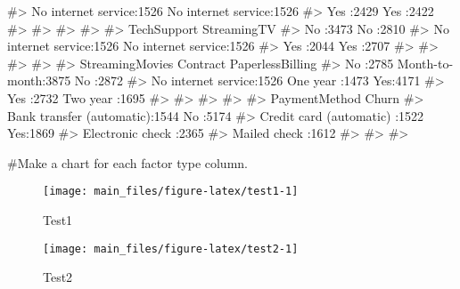 \begin{Schunk}
\begin{Soutput}
#>  No internet service:1526   No internet service:1526   
#>  Yes                :2429   Yes                :2422   
#>                                                        
#>                                                        
#>                                                        
#>                                                        
#>               TechSupport                StreamingTV  
#>  No                 :3473   No                 :2810  
#>  No internet service:1526   No internet service:1526  
#>  Yes                :2044   Yes                :2707  
#>                                                       
#>                                                       
#>                                                       
#>                                                       
#>             StreamingMovies           Contract    PaperlessBilling
#>  No                 :2785   Month-to-month:3875   No :2872        
#>  No internet service:1526   One year      :1473   Yes:4171        
#>  Yes                :2732   Two year      :1695                   
#>                                                                   
#>                                                                   
#>                                                                   
#>                                                                   
#>                    PaymentMethod  Churn     
#>  Bank transfer (automatic):1544   No :5174  
#>  Credit card (automatic)  :1522   Yes:1869  
#>  Electronic check         :2365             
#>  Mailed check             :1612             
#>                                             
#>                                             
#> 
\end{Soutput}
\end{Schunk}

\#Make a chart for each factor type column.

\begin{Schunk}
\begin{figure}[H]

{\centering \texttt{[image: main\_files/figure-latex/test1-1]} 

}

\caption[Test1 ]{Test1 }\label{fig:test1}
\end{figure}
\end{Schunk}

\begin{Schunk}
\begin{figure}[H]

{\centering \texttt{[image: main\_files/figure-latex/test2-1]} 

}

\caption[Test2 ]{Test2 }\label{fig:test2}
\end{figure}
\end{Schunk}

